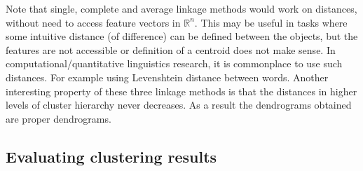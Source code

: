\begin{marginfigure}
\begin{center}

  \end{center}
  \caption{\label{fig:linkage}%
    Single, complete, average and centroid linkage options.
  }
\end{marginfigure}

Note that single, complete and average linkage methods would work
on distances,
without need to access feature vectors in $\mathbb{R}^n$.
This may be useful in tasks where some intuitive distance (of difference)
can be defined between the objects,
but the features are not accessible
or definition of a centroid does not make sense.
In computational/quantitative linguistics research,
it is commonplace to use such distances.
For example using Levenshtein distance between words.
Another interesting property of these three linkage methods is that
the distances in higher levels of cluster hierarchy never decreases.
As a result the dendrograms obtained are proper dendrograms.


\subsection{Evaluating clustering results}

